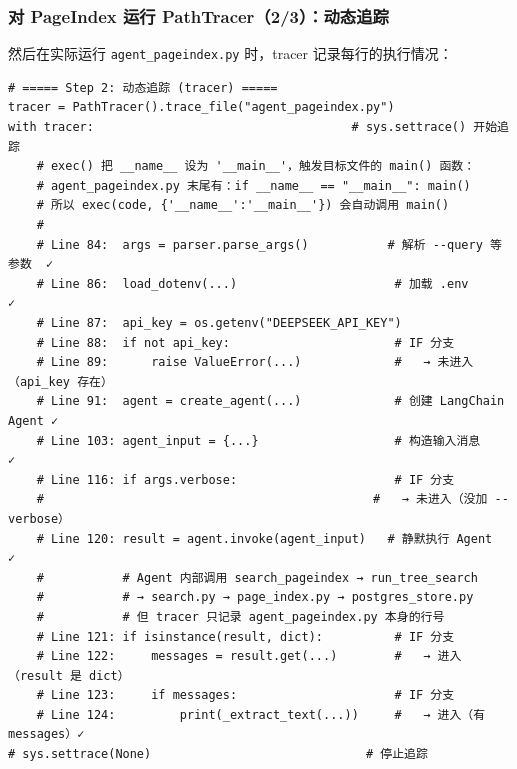 \documentclass[presentation,aspectratio=169,fontset=none]{ctexbeamer}
\begin{document}
\begin{frame}[fragile]
\frametitle{对 PageIndex 运行 PathTracer（2/3）：动态追踪}
{\scriptsize 然后在实际运行 \texttt{agent\_pageindex.py} 时，tracer 记录每行的执行情况：}

\vspace{0.05cm}
{\tiny
\begin{verbatim}
# ===== Step 2: 动态追踪 (tracer) =====
tracer = PathTracer().trace_file("agent_pageindex.py")
with tracer:                                    # sys.settrace() 开始追踪
    # exec() 把 __name__ 设为 '__main__'，触发目标文件的 main() 函数：
    # agent_pageindex.py 末尾有：if __name__ == "__main__": main()
    # 所以 exec(code, {'__name__':'__main__'}) 会自动调用 main()
    #
    # Line 84:  args = parser.parse_args()           # 解析 --query 等参数  ✓
    # Line 86:  load_dotenv(...)                      # 加载 .env           ✓
    # Line 87:  api_key = os.getenv("DEEPSEEK_API_KEY")
    # Line 88:  if not api_key:                       # IF 分支
    # Line 89:      raise ValueError(...)             #   → 未进入（api_key 存在）
    # Line 91:  agent = create_agent(...)             # 创建 LangChain Agent ✓
    # Line 103: agent_input = {...}                   # 构造输入消息          ✓
    # Line 116: if args.verbose:                      # IF 分支
    #                                              #   → 未进入（没加 --verbose）
    # Line 120: result = agent.invoke(agent_input)   # 静默执行 Agent        ✓
    #           # Agent 内部调用 search_pageindex → run_tree_search
    #           # → search.py → page_index.py → postgres_store.py
    #           # 但 tracer 只记录 agent_pageindex.py 本身的行号
    # Line 121: if isinstance(result, dict):          # IF 分支
    # Line 122:     messages = result.get(...)        #   → 进入（result 是 dict）
    # Line 123:     if messages:                      # IF 分支
    # Line 124:         print(_extract_text(...))     #   → 进入（有 messages）✓
# sys.settrace(None)                              # 停止追踪
\end{verbatim}}
\end{frame}

\end{document}
